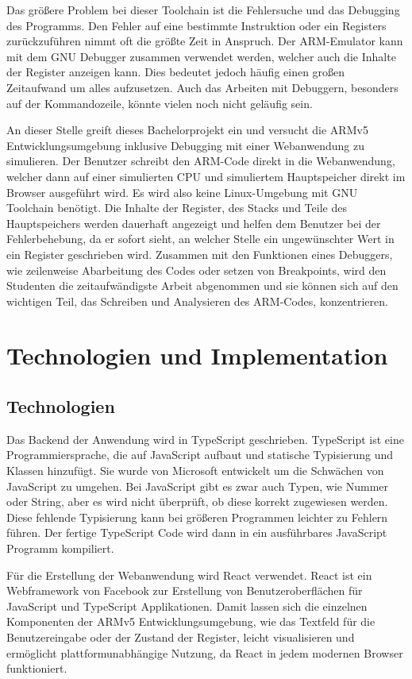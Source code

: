 \documentclass[a4paper, 11pt, onecolumn]{article}
\begin{document}
Das größere Problem bei dieser Toolchain ist die Fehlersuche und das Debugging des Programms. Den Fehler auf eine bestimmte Instruktion oder ein Registers zurückzuführen nimmt oft die größte Zeit in Anspruch. Der ARM-Emulator kann mit dem GNU Debugger \cite{gdb} zusammen verwendet werden, welcher auch die Inhalte der Register anzeigen kann. Dies bedeutet jedoch häufig einen großen Zeitaufwand um alles aufzusetzen. Auch das Arbeiten mit Debuggern, besonders auf der Kommandozeile, könnte vielen noch nicht geläufig sein. 

An dieser Stelle greift dieses Bachelorprojekt ein und versucht die ARMv5 Entwicklungsumgebung inklusive Debugging mit einer Webanwendung zu simulieren. Der Benutzer schreibt den ARM-Code direkt in die Webanwendung, welcher dann auf einer simulierten CPU und simuliertem Hauptspeicher direkt im Browser ausgeführt wird. Es wird also keine Linux-Umgebung mit GNU Toolchain benötigt. Die Inhalte der Register, des Stacks und Teile des Hauptspeichers werden dauerhaft angezeigt und helfen dem Benutzer bei der Fehlerbehebung, da er sofort sieht, an welcher Stelle ein ungewünschter Wert in ein Register geschrieben wird. Zusammen mit den Funktionen eines Debuggers, wie zeilenweise Abarbeitung des Codes oder setzen von Breakpoints, wird den Studenten die zeitaufwändigste Arbeit abgenommen und sie können sich auf den wichtigen Teil, das Schreiben und Analysieren des ARM-Codes, konzentrieren.

\section{Technologien und Implementation}

\subsection{Technologien}

Das Backend der Anwendung wird in TypeScript geschrieben. TypeScript \cite{typescript} ist eine Programmiersprache, die auf JavaScript aufbaut und statische Typisierung und Klassen hinzufügt. Sie wurde von Microsoft entwickelt um die Schwächen von JavaScript zu umgehen. Bei JavaScript gibt es zwar auch Typen, wie Nummer oder String, aber es wird nicht überprüft, ob diese korrekt zugewiesen werden. Diese fehlende Typisierung kann bei größeren Programmen leichter zu Fehlern führen. Der fertige TypeScript Code wird dann in ein ausführbares JavaScript Programm kompiliert.

Für die Erstellung der Webanwendung wird React verwendet. React \cite{react} ist ein Webframework von Facebook zur Erstellung von Benutzeroberflächen für JavaScript und TypeScript Applikationen. Damit lassen sich die einzelnen Komponenten der ARMv5 Entwicklungsumgebung, wie das Textfeld für die Benutzereingabe oder der Zustand der Register, leicht visualisieren und ermöglicht plattformunabhängige Nutzung, da React in jedem modernen Browser funktioniert.
\end{document}
